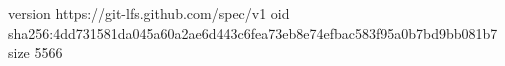 version https://git-lfs.github.com/spec/v1
oid sha256:4dd731581da045a60a2ae6d443c6fea73eb8e74efbac583f95a0b7bd9bb081b7
size 5566
